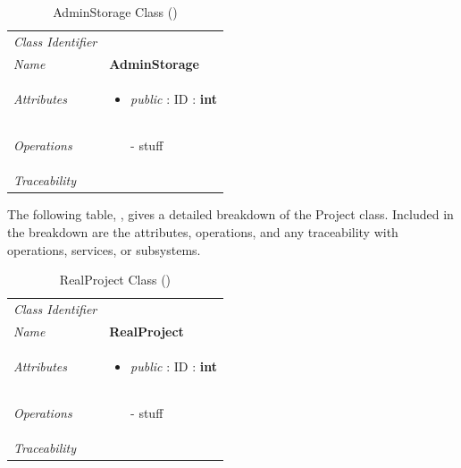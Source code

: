 \documentclass[12pt,letterpaper]{article}
\begin{document}
\begin{table}[H]
    \caption{AdminStorage Class ()} 
	\begin{tabu} to 
		\toprule
		Class Identifier &  \\
		Name & {\bf AdminStorage} \\
		Attributes & 
		\begin{minipage}[t]{\linewidth}
		    \begin{itemize}
		        \item \textit{public} : ID : \bf{int}
			\end{itemize}
	    \end{minipage} \\

		Operations &
		\begin{minipage}[t]{\linewidth}
			\begin{enumerate}
			    \item[-] stuff
	        \end{enumerate}
	    \end{minipage} \\
	    	Traceability & \\
		\toprule
	\end{tabu}
\end{table}

The following table, , gives a detailed breakdown of the Project class. Included in the breakdown are the attributes, operations, and any traceability with operations, services, or subsystems.

\begin{table}[H]
    \caption{RealProject Class ()} 
	\begin{tabu} to 
		\toprule
		Class Identifier &  \\
		Name & {\bf RealProject} \\
		Attributes & 
		\begin{minipage}[t]{\linewidth}
		    \begin{itemize}
		        \item \textit{public} : ID : \bf{int}
			\end{itemize}
	    \end{minipage} \\

		Operations &
		\begin{minipage}[t]{\linewidth}
			\begin{enumerate}
			    \item[-] stuff
	        \end{enumerate}
	    \end{minipage} \\
	    	Traceability & \\
		\toprule
	\end{tabu}
\end{table}
\end{document}
